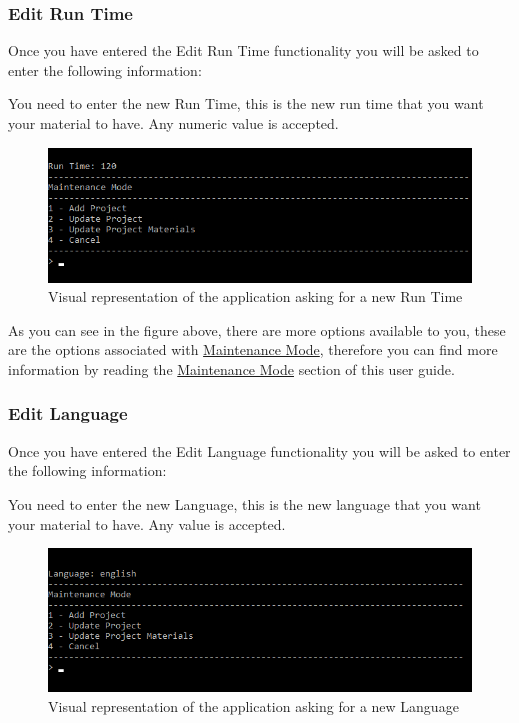 \documentclass[
  english,
  a4paper,
,tablecaptionabove
]{scrartcl}
\begin{document}
\newpage

\hypertarget{edit-run-time-1}{%
\subsubsection{Edit Run Time}\label{edit-run-time-1}}

Once you have entered the Edit Run Time functionality you will be asked
to enter the following information:

You need to enter the new Run Time, this is the new run time that you
want your material to have. Any numeric value is accepted.

\begin{figure}
\centering
\includegraphics{images/user-guide/maintenance-mode/update-project-material-run-time.png}
\caption{Visual representation of the application asking for a new Run
Time}
\end{figure}

As you can see in the figure above, there are more options available to
you, these are the options associated with
\protect\hyperlink{using-maintenance-mode}{Maintenance Mode}, therefore
you can find more information by reading the
\protect\hyperlink{using-maintenance-mode}{Maintenance Mode} section of
this user guide.

\newpage

\hypertarget{edit-language-1}{%
\subsubsection{Edit Language}\label{edit-language-1}}

Once you have entered the Edit Language functionality you will be asked
to enter the following information:

You need to enter the new Language, this is the new language that you
want your material to have. Any value is accepted.

\begin{figure}
\centering
\includegraphics{images/user-guide/maintenance-mode/update-project-material-language.png}
\caption{Visual representation of the application asking for a new
Language}
\end{figure}
\end{document}
